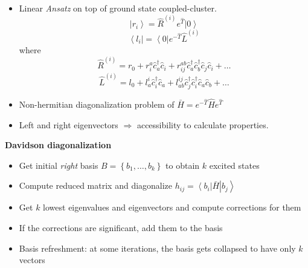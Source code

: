 \begin{itemize}
  \item
    Linear \textit{Ansatz} on top of ground state coupled-cluster.
      $$
      \left | r_i \right \rangle =
      \hat{R} ^{(i)} e^{\hat{T}} \left | 0  \right \rangle
      $$
      $$
      \left \langle l_i \right | =
      \left \langle 0 \right | e^{-\hat{T}} \hat{L}^{(i)}
      $$
    where
      $$
        \hat{R} ^{(i)} = r _{0}
                       + r ^{a} _{i} \hat{c} ^{\dagger} _{a} \hat{c} _{i}
                       + r ^{ab} _{ij} \hat{c} ^{\dagger} _{a} \hat{c} ^{\dagger} _{b}
                              \hat{c} _{j} \hat{c} _{i}
                       + \ldots
      $$
      $$
        \hat{L} ^{(i)} = l _{0}
                       + l ^{i} _{a} \hat{c} _{i}^{\dagger} \hat{c} _{a}
                       + l ^{ij} _{ab}
                          \hat{c} _{j} ^{\dagger} \hat{c} _{i}^{\dagger}
                          \hat{c} _{a} \hat{c} _{b}
                       + \ldots
      $$

  \item
    Non-hermitian diagonalization problem of
      $ \bar{H} = e^{-\hat{T}} \hat{H} e^{\hat{T}}$

  \item
    Left and right eigenvectors $ \Rightarrow $ accessibility to calculate
    properties.

\end{itemize}

\textbf{Davidson diagonalization}
\begin{itemize}

  \item
    Get initial \textit{right} basis
    $ B = \left \{ b_{1}, \ldots, b_{k} \right \} $
    to obtain $ k $ excited states

  \item
    Compute reduced matrix and diagonalize
    $
      h_{ij} =
      \left \langle b_{i} \right | \bar H \left | b_{j} \right \rangle
    $

  \item
    Get $ k $ lowest eigenvalues and eigenvectors and compute corrections
    for them

  \item
    If the corrections are significant, add them to the basis

  \item
    Basis refreshment: at some iterations, the basis gets collapsed
    to have only $ k $ vectors

\end{itemize}
